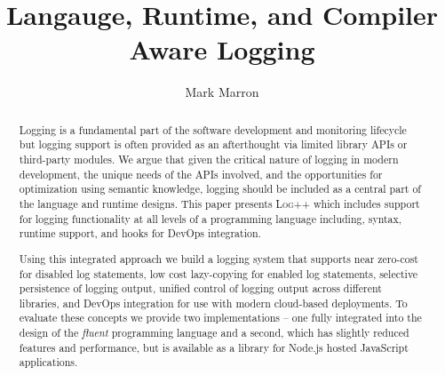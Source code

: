 \documentclass[sigplan,10pt,review]{acmart}
\newcommand{\projn}{\textsc{Log++}\xspace}
\newcommand{\ourtitle}{Langauge, Runtime, and Compiler Aware Logging}
\begin{document}

\acmISBN{} %
\acmDOI{} %




\title{\ourtitle}

\author{Mark Marron}

\maketitle

\begin{abstract} 
Logging is a fundamental part of the software development and
monitoring lifecycle but logging support is often provided as an afterthought 
via limited library APIs or third-party modules. We argue that given the critical
nature of logging in modern development, the unique needs of the APIs involved,
and the opportunities for optimization using semantic knowledge, logging should
be included as a central part of the language and runtime designs. This paper
presents \projn which includes support for
logging functionality at all levels of a programming language including, syntax,
runtime support, and hooks for DevOps integration.

Using this integrated approach we build a logging system that supports near
zero-cost for disabled log statements, low cost lazy-copying for enabled log
statements, selective persistence of logging output, unified control of logging
output across different libraries, and DevOps integration for use with modern
cloud-based deployments. To evaluate these concepts we provide two
implementations -- one fully integrated into the design of the \emph{fluent}
programming language and a second, which has slightly reduced features and
performance, but is available as a library for Node.js hosted JavaScript
applications.
\end{abstract}
\end{document}
